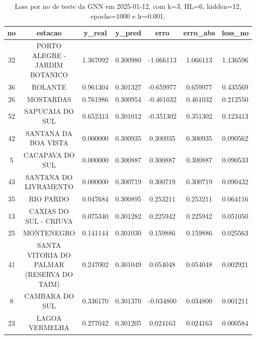 \begin{table}[h]
\centering
\caption{Loss por no de teste da GNN em 2025-01-12, com k=3, HL=6, hidden=12, epochs=1000 e lr=0.001.}
\label{tab:gnn_loss_k3_hl6_h12_e1000_d20250112}
\begin{tabular}{ccccccc}
\toprule
no & estacao & y\_real & y\_pred & erro & erro\_abs & loss\_no \\
\midrule
32 & PORTO ALEGRE - JARDIM BOTANICO & 1.367092 & 0.300980 & -1.066113 & 1.066113 & 1.136596 \\
36 & ROLANTE & 0.961304 & 0.301327 & -0.659977 & 0.659977 & 0.435569 \\
26 & MOSTARDAS & 0.761986 & 0.300954 & -0.461032 & 0.461032 & 0.212550 \\
52 & SAPUCAIA DO SUL & 0.652313 & 0.301012 & -0.351302 & 0.351302 & 0.123413 \\
42 & SANTANA DA BOA VISTA & 0.000000 & 0.300935 & 0.300935 & 0.300935 & 0.090562 \\
5 & CACAPAVA DO SUL & 0.000000 & 0.300887 & 0.300887 & 0.300887 & 0.090533 \\
43 & SANTANA DO LIVRAMENTO & 0.000000 & 0.300719 & 0.300719 & 0.300719 & 0.090432 \\
35 & RIO PARDO & 0.047684 & 0.300895 & 0.253211 & 0.253211 & 0.064116 \\
13 & CAXIAS DO SUL - CRIUVA & 0.075340 & 0.301282 & 0.225942 & 0.225942 & 0.051050 \\
25 & MONTENEGRO & 0.141144 & 0.301030 & 0.159886 & 0.159886 & 0.025563 \\
41 & SANTA VITORIA DO PALMAR (RESERVA DO TAIM) & 0.247002 & 0.301049 & 0.054048 & 0.054048 & 0.002921 \\
8 & CAMBARA DO SUL & 0.336170 & 0.301370 & -0.034800 & 0.034800 & 0.001211 \\
23 & LAGOA VERMELHA & 0.277042 & 0.301205 & 0.024163 & 0.024163 & 0.000584 \\
\bottomrule
\end{tabular}
\end{table}
